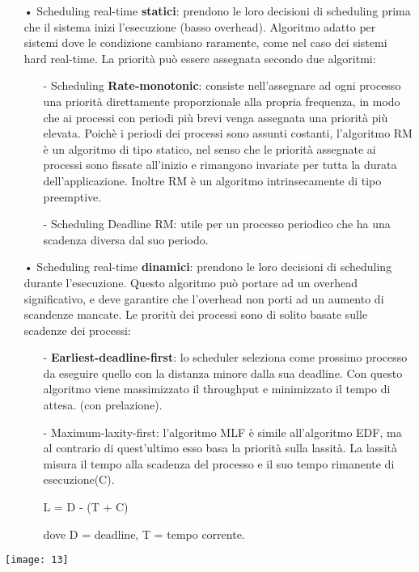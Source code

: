 \documentclass{article}
\begin{document}
\begin{enumerate}
   \item[•] Scheduling real-time \textbf{statici}: prendono le loro decisioni di scheduling
prima che il sistema inizi l’esecuzione (basso overhead). Algoritmo adatto
per sistemi dove le condizione cambiano raramente, come nel caso dei sistemi hard real-time.
La priorità può essere assegnata secondo due algoritmi:
      \begin{enumerate}
         \item[-] Scheduling \textbf{Rate-monotonic}: consiste nell’assegnare ad ogni processo una priorità direttamente proporzionale alla propria frequenza,
in modo che ai processi con periodi più brevi venga assegnata una priorità più elevata. Poichè i periodi dei processi sono assunti costanti,
l’algoritmo RM è un algoritmo di tipo statico, nel senso che le priorità
assegnate ai processi sono fissate all’inizio e rimangono invariate per
tutta la durata dell’applicazione. Inoltre RM è un algoritmo intrinsecamente di tipo preemptive.
         \item[-] Scheduling Deadline RM: utile per un processo periodico che ha
una scadenza diversa dal suo periodo.
      \end{enumerate}
   \item[•] Scheduling real-time \textbf{dinamici}: prendono le loro decisioni di scheduling
durante l’esecuzione. Questo algoritmo può portare ad un overhead significativo, e deve garantire che l’overhead non porti ad un aumento di
scandenze mancate. Le proritù dei processi sono di solito basate sulle
scadenze dei processi:
      \begin{enumerate}
         \item[-] \textbf{Earliest-deadline-first}: lo scheduler seleziona come prossimo processo da eseguire quello con la distanza minore dalla sua deadline.
Con questo algoritmo viene massimizzato il throughput e minimizzato il tempo di attesa. (con prelazione).
         \item[-] Maximum-laxity-first: l’algoritmo MLF è simile all’algoritmo EDF,
ma al contrario di quest’ultimo esso basa la priorità sulla lassità.
La lassità misura il tempo alla scadenza del processo e il suo tempo
rimanente di esecuzione(C).
            \begin{center}L = D - (T + C)\end{center}
         dove D = deadline, T = tempo corrente.
      \end{enumerate}
\end{enumerate}
\texttt{[image: 13]}
\end{document}
